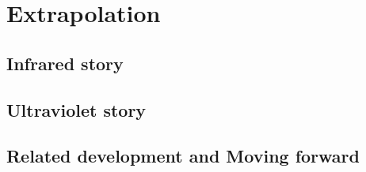 \cleardoublepage
\chapter{Extrapolation}

	\section{Infrared story}

	\section{Ultraviolet story}

	\section{Related development and Moving forward}